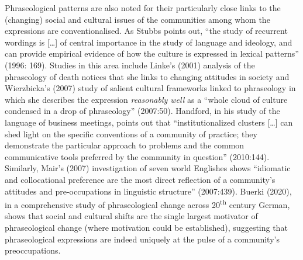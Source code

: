 \documentclass[12pt]{article}
\newenvironment{styleStandard}{\setlength\leftskip{0cm}\setlength\rightskip{0cm plus 1fil}\setlength\parindent{0cm}\setlength\parfillskip{0pt plus 1fil}\setlength\parskip{0in plus 1pt}\writerlistparindent\writerlistleftskip\leavevmode\normalfont\normalsize\writerlistlabel\ignorespaces}{\unskip\vspace{0.111in plus 0.0111in}\par}
\newcommand\writerlistleftskip{}
\newcommand\writerlistparindent{}
\newcommand\writerlistlabel{}
\begin{document}
\begin{styleStandard}
Phraseological patterns are also noted for their particularly close links to the (changing) social and cultural issues of the communities among whom the expressions are conventionalised. As Stubbs points out, “the study of recurrent wordings is […] of central importance in the study of language and ideology, and can provide empirical evidence of how the culture is expressed in lexical patterns” (1996: 169). Studies in this area include Linke’s (2001) analysis of the phraseology of death notices that she links to changing attitudes in society and Wierzbicka’s (2007) study of salient cultural frameworks linked to phraseology in which she describes the expression \textit{reasonably well} as a “whole cloud of culture condensed in a drop of phraseology” (2007:50). Handford, in his study of the language of business meetings, points out that “institutionalized clusters […] can shed light on the specific conventions of a community of practice; they demonstrate the particular approach to problems and the common communicative tools preferred by the community in question” (2010:144). Similarly, Mair’s (2007) investigation of seven world Englishes shows “idiomatic and collocational preference are the most direct reflection of a community’s attitudes and pre-occupations in linguistic structure” (2007:439). Buerki (2020), in a comprehensive study of phraseological change across 20\textsuperscript{th} century German, shows that social and cultural shifts are the single largest motivator of phraseological change (where motivation could be established), suggesting that phraseological expressions are indeed uniquely at the pulse of a community’s preoccupations.
\end{styleStandard}
\end{document}

